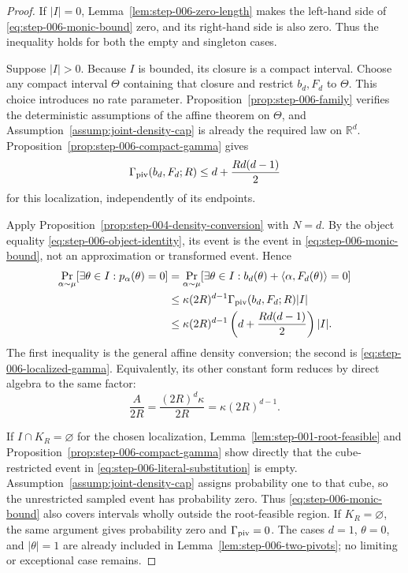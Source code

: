 \begin{proof}
If $|I|=0$, Lemma~\ref{lem:step-006-zero-length} makes the left-hand side of
\eqref{eq:step-006-monic-bound} zero, and its right-hand side is also zero.
Thus the inequality holds for both the empty and singleton cases.

Suppose $|I|>0$.  Because $I$ is bounded, its closure is a compact interval.
Choose any compact interval $\Theta$ containing that closure and restrict
$b_d,F_d$ to $\Theta$.  This choice introduces no rate parameter.
Proposition~\ref{prop:step-006-family} verifies the deterministic
assumptions of the affine theorem on $\Theta$, and
Assumption~\ref{assump:joint-density-cap} is already the required law on
$\mathbb R^d$.  Proposition~\ref{prop:step-006-compact-gamma} gives
\begin{equation}
\Gamma_{\rm piv}(b_d,F_d;R)
\leq d+\frac{Rd(d-1)}2
\label{eq:step-006-localized-gamma}
\end{equation}
for this localization, independently of its endpoints.

Apply Proposition~\ref{prop:step-004-density-conversion} with $N=d$.  By
the object equality \eqref{eq:step-006-object-identity}, its event is the
event in \eqref{eq:step-006-monic-bound}, not an approximation or
transformed event.  Hence
\begin{equation}
\begin{aligned}
\Pr_{\alpha\sim\mu}
[\exists\theta\in I:p_\alpha(\theta)=0]
&=\Pr_{\alpha\sim\mu}
[\exists\theta\in I:b_d(\theta)
  +\langle\alpha,F_d(\theta)\rangle=0]\\
&\leq\kappa(2R)^{d-1}
  \Gamma_{\rm piv}(b_d,F_d;R)|I|\\
&\leq\kappa(2R)^{d-1}
  \left(d+\frac{Rd(d-1)}2\right)|I|.
\end{aligned}
\label{eq:step-006-literal-substitution}
\end{equation}
The first inequality is the general affine density conversion; the second is
\eqref{eq:step-006-localized-gamma}.  Equivalently, its other constant form
reduces by direct algebra to the same factor:
\begin{equation}
\frac A{2R}
=\frac{(2R)^d\kappa}{2R}
=\kappa(2R)^{d-1}.
\label{eq:step-006-a-substitution}
\end{equation}

If $I\cap K_R=\varnothing$ for the chosen localization,
Lemma~\ref{lem:step-001-root-feasible} and
Proposition~\ref{prop:step-006-compact-gamma} show directly that the
cube-restricted event in \eqref{eq:step-006-literal-substitution} is empty.
Assumption~\ref{assump:joint-density-cap} assigns probability one to that
cube, so the unrestricted sampled event has probability zero.  Thus
\eqref{eq:step-006-monic-bound} also covers intervals wholly outside the
root-feasible region.  If $K_R=\varnothing$, the same argument gives
probability zero and $\Gamma_{\rm piv}=0$.  The cases $d=1$, $\theta=0$,
and $|\theta|=1$ are already included in
Lemma~\ref{lem:step-006-two-pivots}; no limiting or exceptional case
remains.
\end{proof}

